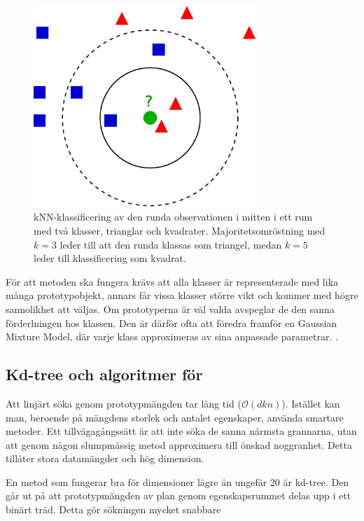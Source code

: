 \documentclass[../rapport_MVEX01-11-05]{subfiles}
\begin{document}
\begin{figure}[!htb]
    \begin{center}
\includegraphics[width=0.75\textwidth]{bilder/KnnClassification}
    \end{center}
    \caption{kNN-klassificering av den runda observationen i mitten i ett rum
    med två klasser, trianglar och kvadrater. Majoritetsomröstning
    med $k=3$ leder till att den runda klassas som triangel, medan $k=5$ leder
    till klassificering som kvadrat.}
    \label{fig:knn-overview}
\end{figure}

För att metoden ska fungera krävs att alla klasser är representerade med lika
många prototypobjekt, annars får vissa klasser större vikt och kommer med högre
sannolikhet att väljas. Om prototyperna är väl valda avspeglar de den sanna
förderlningen hos klassen.
Den är därför ofta att föredra framför en Gaussian Mixture Model, där
varje klass approximeras av sina anpassade parametrar.
\cite{Hastie09}.

\subsection{Kd-tree och algoritmer för \knn}
Att linjärt söka genom prototypmängden tar lång tid ($\mathcal{O}(d k n)$). Istället kan man,
beroende på mängdens storlek och antalet egenskaper, använda smartare
metoder. Ett tillvägagångssätt är att inte söka de sanna närmsta grannarna,
utan att genom någon slumpmässig metod approximera till önskad noggranhet.
Detta tillåter stora datamängder och hög dimension.

En metod som fungerar bra för dimensioner lägre än ungefär 20 är kd-tree.
Den går ut på att prototypmängden av plan genom egenskapsrummet
delas upp i ett binärt träd. Detta gör sökningen mycket snabbare

%

\end{document}
